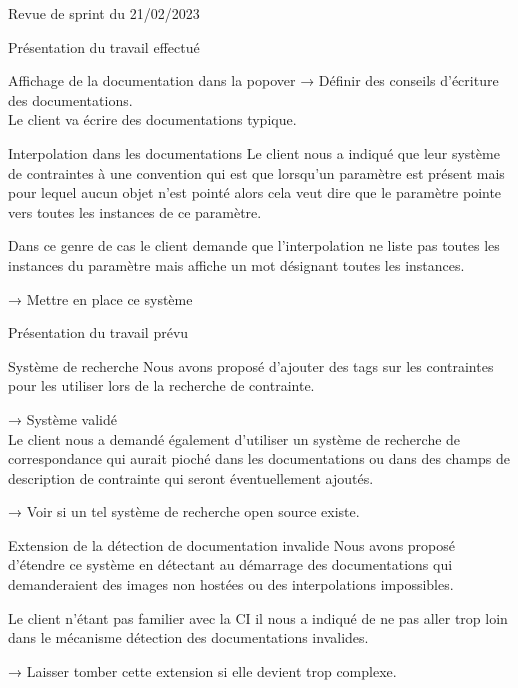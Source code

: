 \documentclass[]{article}
\begin{document}
{\begin{section}{Revue de sprint du 21/02/2023}
\begin{subsection}{Présentation du travail effectué}
\begin{subsubsection}{Affichage de la documentation dans la popover}
         → Définir des conseils d’écriture des documentations.
         \\[5mm]
         Le client va écrire des documentations typique.
     \end{subsubsection}

     \newpage

     \begin{subsubsection}{Interpolation dans les documentations}
         Le client nous a indiqué que leur système de contraintes à une convention qui est que lorsqu’un paramètre est présent mais pour lequel aucun objet n’est pointé alors cela veut dire que le paramètre pointe vers toutes les instances de ce paramètre.

         Dans ce genre de cas le client demande que l’interpolation ne liste pas toutes les instances du paramètre mais affiche un mot désignant toutes les instances.

         → Mettre en place ce système
     \end{subsubsection}
 \end{subsection}

 \begin{subsection}{Présentation du travail prévu}
     \begin{subsubsection}{Système de recherche}
         Nous avons proposé d’ajouter des tags sur les contraintes pour les utiliser lors de la recherche de contrainte.

         → Système validé
         \\[5mm]
         Le client nous a demandé également d’utiliser un système de recherche de correspondance qui aurait pioché dans les documentations ou dans des champs de description de contrainte qui seront éventuellement ajoutés.

         → Voir si un tel système de recherche open source existe.
     \end{subsubsection}

     \begin{subsubsection}{Extension de la détection de documentation invalide}
         Nous avons proposé d’étendre ce système en détectant au démarrage des documentations qui demanderaient des images non hostées ou des interpolations impossibles.

         Le client n’étant pas familier avec la CI il nous a indiqué de ne pas aller trop loin dans le mécanisme détection des documentations invalides.

         → Laisser tomber cette extension si elle devient trop complexe.
     \end{subsubsection}
 \end{subsection}


\end{section}}
\end{document}
